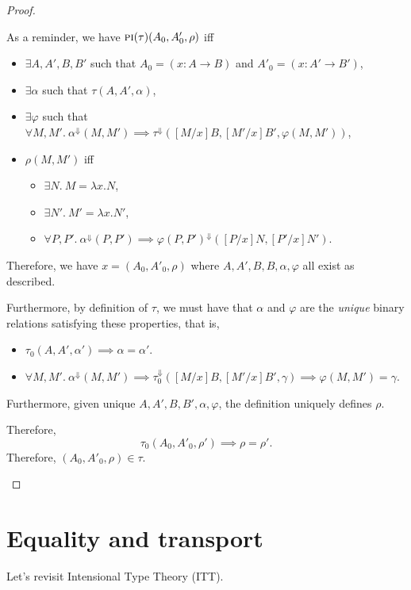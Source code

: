 \documentclass{article} \usepackage{chtt-notes} \usepackage{stmaryrd}
\begin{document}
\begin{proof}
\begin{itemize}
    As a reminder, we have $\textsc{pi}(\tau)(A_0, A'_0, \rho)$ iff
    \begin{itemize}
      \item $\exists A,A',B,B'$ such that $A_0 = (x:A \to B)$ and $A'_0 = (x : A' \to B')$,
      \item $\exists \alpha$ such that $\tau(A,A',\alpha)$,
      \item $\exists \varphi$ such that $\forall M, M' .~ \alpha^\Downarrow(M,M') \implies \tau^\Downarrow([M/x]B, [M'/x]B', \varphi(M,M'))$,
      \item $\rho(M, M')$ iff
      \begin{itemize}
        \item $\exists N .~ M = \lambda x.N$,
        \item $\exists N' .~ M'= \lambda x.N'$,
        \item $\forall P, P' .~ \alpha^\Downarrow(P,P') \implies \varphi(P,P')^\Downarrow([P/x]N,[P'/x]N')$.
      \end{itemize}
    \end{itemize}
    Therefore, we have $x = (A_0, A'_0, \rho)$ where $A,A',B,B,\alpha,\varphi$ all exist as described.

    Furthermore, by definition of $\tau$, we must have that $\alpha$ and $\varphi$ are the \emph{unique}
    binary relations satisfying these properties, that is,
    \begin{itemize}
      \item $\tau_0(A,A',\alpha') \implies \alpha = \alpha'$.
      \item $\forall M,M' .~ \alpha^\Downarrow(M,M') \implies \tau_0^\Downarrow([M/x]B, [M'/x]B', \gamma) \implies \varphi(M,M') = \gamma$.
    \end{itemize}
    Furthermore, given unique $A,A',B,B',\alpha,\varphi$, the definition uniquely defines $\rho$.

    Therefore,
    \[
      \tau_0(A_0,A'_0,\rho') \implies \rho = \rho'.
    \]
    Therefore, $(A_0, A'_0, \rho) \in \tau$.
  \end{itemize}
\end{proof}

\section{Equality and transport}%

Let's revisit Intensional Type Theory (ITT).
\end{document}
